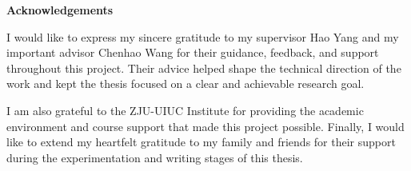 \centerline{\xiaoyi\bfseries Acknowledgements}
\vspace{4em}

I would like to express my sincere gratitude to my supervisor Hao Yang and my 
important advisor Chenhao Wang for
their guidance, feedback, and support throughout this project. Their advice helped
shape the technical direction of the work and kept the thesis focused on a
clear and achievable research goal.

I am also grateful to the ZJU-UIUC Institute for providing the academic
environment and course support that made this project possible. Finally, I
would like to extend my heartfelt gratitude to my family and friends for their support during the
experimentation and writing stages of this thesis.
